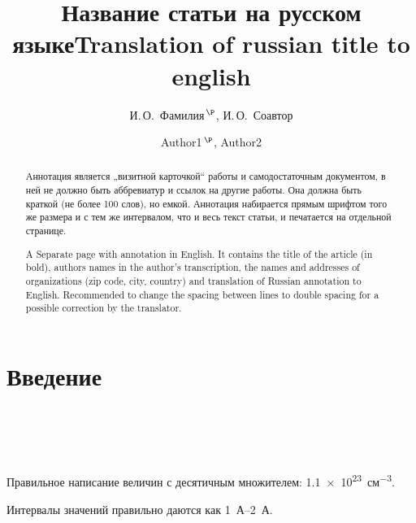 \documentclass[14pt]{extarticle}
\begin{document}
\title{Название статьи на русском языке}
\author{И.\,О.~Фамилия$^{\,\P}$, И.\,О.~Соавтор}
\address{Физико-технический институт им. А. Ф. Иоффе Российской академии наук, \\
		194021 Санкт-Петербург, Россия.}
\maketitle

\begin{abstract}
	Аннотация является „визитной карточкой“ работы и самодостаточным документом,
	в ней не должно быть аббревиатур и ссылок на другие работы. Она должна быть краткой
	(не более 100 слов), но емкой. Аннотация набирается прямым шрифтом того же размера
	и с тем же интервалом, что и весь текст статьи, и печатается на отдельной странице.
\end{abstract}


\begin{otherlanguage}{english}
	\title{Translation of russian title to english}
	\author{Author1$^{\,\P}$, Author2}
	\address{Ioffe Physicotechnical Institute, Russian Academy of Sciences, \\
			194021 St. Petersburg, Russia.}
	\maketitle
	
	\begin{abstract}
		A Separate page with annotation in English. It contains the title of the article (in bold), authors names in the author's transcription, the names and addresses of organizations (zip code, city, country) and translation of Russian annotation to English.  Recommended to change the spacing between lines to double spacing for a possible correction by the translator.
	\end{abstract}
\end{otherlanguage}

\section{Введение}
\cite{ref1,ref2,ref3} \\
\cite{ref4,ref5} \\
\cite{ref6} \\
\cite{ref7,ref8,ref9} \\

Правильное написание величин с десятичным множителем: \SI{1,1e23}{см^{-3}}. \par
Интервалы значений правильно даются как \SIrange{1}{2}{А}. \par
\end{document}
